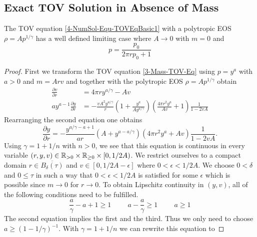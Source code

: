\begin{appendix}
\begin{section}
\subsection{Exact TOV Solution in Absence of Mass}
\begin{theorem}
	The TOV equation \ref{4-NumSol-Equ-TOVEqBasic1} with a polytropic EOS $\rho=Ap^{1/\gamma}$ has a well defined limiting case where $A\rightarrow0$ with $m=0$ and
	\begin{equation}
		p = \frac{p_0}{2\pi rp_0+1}
	\end{equation}
\end{theorem}
\begin{proof}
	First we transform the TOV equation \ref{3-Mass-TOV-Eq} using $p=y^a$ with $a>0$ and $m=Arv$ and together with the polytropic EOS $\rho=Ap^{1/\gamma}$ obtain
	\begin{align}
		\frac{\partial v}{\partial r} &= 4\pi ry^{a/\gamma}-Av\\
		ay^{a-1}\frac{\partial y}{\partial r} &= -\frac{vA^2y^{a/\gamma}}{r}\left(1+\frac{y^a}{Ay^{a/\gamma}}\right)\left(\frac{4\pi r^2y^a}{Av} +1\right)\frac{1}{1-2vA}
		\label{tmp-label-2}
	\end{align}
	Rearranging the second equation one obtains
	\begin{equation}
		\frac{\partial y}{\partial r} = -\frac{y^{a/\gamma-a+1}}{ar}\left(A+y^{a-a/\gamma}\right)\left(4\pi r^2y^a +Av\right)\frac{1}{1-2vA}.
	\end{equation}
	Using $\gamma=1+1/n$ with $n>0$, we see that this equation is continuous in every variable $(r,y,v)\in\mathbb{R}_{>0}\times\mathbb{R}_{\geq0}\times[0,1/2A)$. We restrict 
	ourselves to a compact domain $r\in \overline{B_{\delta}(\tau)}$ and $v\in[0,1/2A-\epsilon]$ where $0<\epsilon<1/2A$. 
	We choose $0<\delta$ and $0\leq\tau$ in such a way that $0<\epsilon<1/2A$ is satisfied for some $\epsilon$ which is possible since $m\rightarrow0$ for $r\rightarrow0$.
	To obtain Lipschitz continuity in $(y,v)$, all of the following conditions need to be fulfilled.
	\begin{equation}
		\frac{a}{\gamma}-a+1 \geq 1 \hspace{1cm} a-\frac{a}{\gamma} \geq 1 \hspace{1cm} a \geq 1
		\label{tmp-label-1}
	\end{equation}
	The second equation implies the first and the third. Thus we only need to choose $a\geq(1-1/\gamma)^{-1}$. With $\gamma=1+1/n$ we can rewrite this equation to 

\end{proof}
\end{section}
\end{appendix}
